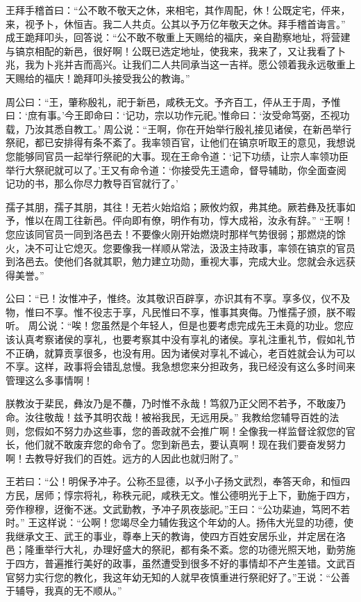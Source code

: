 \documentclass[12pt,UTF8]{ctexbook}
\begin{document}
王拜手稽首曰：“公不敢不敬天之休，来相宅，其作周配，休！公既定宅，伻来，来，视予卜，休恒吉。我二人共贞。公其以予万亿年敬天之休。拜手稽首诲言。”
成王跪拜叩头，回答说：“公不敢不敬重上天赐给的福庆，亲自勘察地址，将营建与镐京相配的新邑，很好啊！公既已选定地址，使我来，我来了，又让我看了卜兆，我为卜兆并吉而高兴。让我们二人共同承当这一吉祥。愿公领着我永远敬重上天赐给的福庆！跪拜叩头接受我公的教诲。”

周公曰：“王，肇称殷礼，祀于新邑，咸秩无文。予齐百工，伻从王于周，予惟曰：‘庶有事。’今王即命曰：‘记功，宗以功作元祀。’惟命曰：‘汝受命笃弼，丕视功载，乃汝其悉自教工。’
周公说：“王啊，你在开始举行殷礼接见诸侯，在新邑举行祭祀，都已安排得有条不紊了。我率领百官，让他们在镐京听取王的意见，我想说您能够同官员一起举行祭祀的大事。现在王命令道：‘记下功绩，让宗人率领功臣举行大祭祀就可以了。’王又有命令道：‘你接受先王遗命，督导辅助，你全面查阅记功的书，那么你尽力教导百官就行了。’

孺子其朋，孺子其朋，其往！无若火始焰焰；厥攸灼叙，弗其绝。厥若彝及抚事如予，惟以在周工往新邑。伻向即有僚，明作有功，惇大成裕，汝永有辞。”
“王啊！您应该同官员一同到洛邑去！不要像火刚开始燃烧时那样气势很弱；那燃烧的馀火，决不可让它熄灭。您要像我一样顺从常法，汲汲主持政事，率领在镐京的官员到洛邑去。使他们各就其职，勉力建立功勋，重视大事，完成大业。您就会永远获得美誉。”

公曰：“已！汝惟冲子，惟终。汝其敬识百辟享，亦识其有不享。享多仪，仪不及物，惟曰不享。惟不役志于享，凡民惟曰不享，惟事其爽侮。乃惟孺子颁，朕不暇听。
周公说：“唉！您虽然是个年轻人，但是也要考虑完成先王未竟的功业。您应该认真考察诸侯的享礼，也要考察其中没有享礼的诸侯。享礼注重礼节，假如礼节不正确，就算贡享很多，也没有用。因为诸侯对享礼不诚心，老百姓就会认为可以不享。这样，政事将会错乱怠慢。我急想您来分担政务，我已经没有这么多时间来管理这么多事情啊！

朕教汝于棐民，彝汝乃是不蘉，乃时惟不永哉！笃叙乃正父罔不若予，不敢废乃命。汝往敬哉！兹予其明农哉！被裕我民，无远用戾。”
我教给您辅导百姓的法则，您假如不努力办这些事，您的善政就不会推广啊！全像我一样监督诠叙您的官长，他们就不敢废弃您的命令了。您到新邑去，要认真啊！现在我们要奋发努力啊！去教导好我们的百姓。远方的人因此也就归附了。”

王若曰：“公！明保予冲子。公称丕显德，以予小子扬文武烈，奉答天命，和恒四方民，居师；惇宗将礼，称秩元祀，咸秩无文。惟公德明光于上下，勤施于四方，旁作穆穆，迓衡不迷。文武勤教，予冲子夙夜毖祀。”王曰：“公功棐迪，笃罔不若时。”
王这样说：“公啊！您竭尽全力辅佐我这个年幼的人。扬伟大光显的功德，使我继承文王、武王的事业，尊奉上天的教诲，使四方百姓安居乐业，并定居在洛邑；隆重举行大礼，办理好盛大的祭祀，都有条不紊。您的功德光照天地，勤劳施于四方，普遍推行美好的政事，虽然遭受到很多不好的事情却不产生差错。文武百官努力实行您的教化，我这年幼无知的人就早夜慎重进行祭祀好了。”王说：“公善于辅导，我真的无不顺从。”
\end{document}
